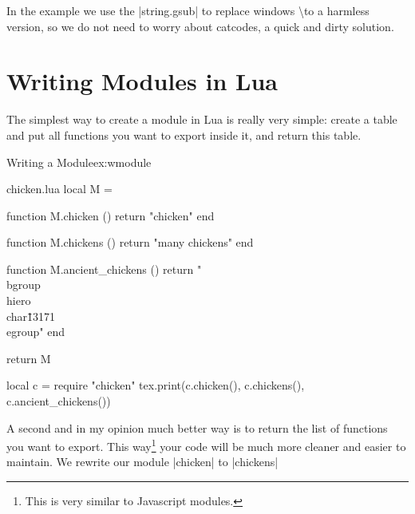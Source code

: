 In the example we use the |string.gsub| to replace windows \textbackslash to a harmless version, so we do not need to worry about catcodes, a quick and dirty solution. 

\section{Writing Modules in Lua}

The simplest way to create a module in Lua is really very simple: create a table and put all functions you want to export inside it, and return this table.

\begin{texexample}{Writing a Module}{ex:wmodule}
\begin{filecontents*}{chicken.lua}
local M = {}

function M.chicken ()
  return "chicken"
end

function M.chickens ()
  return "many chickens" 
end

function M.ancient_chickens ()
  return "\\bgroup\\hiero\\char\"13171 \\egroup"
end

return M
\end{filecontents*}

\begin{luacode*}
local c = require "chicken"
      tex.print(c.chicken(), c.chickens(), c.ancient_chickens())
\end{luacode*}
\end{texexample}

A second and in my opinion much better way is to return the list of functions you want to export. This way\footnote{This is very similar to Javascript modules.} your code will be much more cleaner and easier to maintain. We rewrite our module |chicken|  to |chickens|

